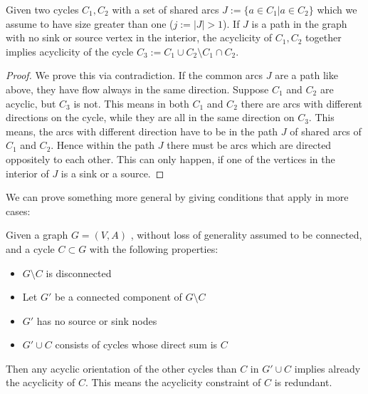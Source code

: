 \begin{prop}
 Given two cycles $C_1, C_2$ with a set of shared arcs $J:=\{a\in C_1|a\in C_2\}$ which we assume to have size greater 
than one ($j:=|J|>1$). If $J$ is a path in the graph with no sink or source vertex in the interior, the acyclicity of 
$C_1, C_2$ together implies acyclicity of the cycle $C_3:=C_1\cup C_2\setminus C_1\cap C_2$.
\end{prop}
\begin{proof}
 We prove this via contradiction. If the common arcs $J$ are a path like above, they have flow always in the same 
direction. Suppose $C_1$ and $C_2$ are acyclic, but $C_3$ is not. This means in both $C_1$ and $C_2$ there are arcs 
with different directions on the cycle, while they are all in the same direction on $C_3$. This means, the arcs with 
different direction have to be in the path $J$ of shared arcs of $C_1$ and $C_2$. Hence within the path $J$ there must 
be arcs which are directed oppositely to each other. This can only happen, if one of the vertices in the interior of 
$J$ is a sink or a source. \Lightning
\end{proof}
We can prove something more general by giving conditions that apply in more cases:
\begin{prop}
 Given a graph $G=(V,A)$ , without loss of generality assumed to be connected, and a cycle $C\subset G$ with the 
following properties:
 \begin{itemize}
  \item $G\setminus C$ is disconnected
  \item Let $G'$ be a connected component of $G\setminus C$ 
  \item $G'$ has no source or sink nodes
  \item $G'\cup C$ consists of cycles whose direct sum is $C$ %
 \end{itemize}
 Then any acyclic orientation of the other cycles than $C$ in $G'\cup C$ implies already the acyclicity of $C$. This 
  means the acyclicity constraint of $C$ is redundant.

\end{prop}
